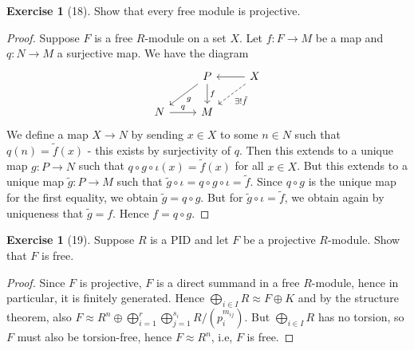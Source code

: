 \documentclass[reqno]{amsart}
\theoremstyle{definition}
\newtheorem{exercise}[theorem]{Exercise}
\theoremstyle{remark}
\begin{document}
    \begin{exercise}[18]
        Show that every free module is projective.
    \end{exercise}

    \begin{proof}
        Suppose $F$ is a free $R$-module on a set $X$.
        Let $f \colon F \to M$ be a map
        and $q \colon N \to M$ a surjective map. We have
        the diagram
        \begin{equation*}
        \begin{tikzcd}
            & P \ar[d, "f"] \ar[dl, "g"] & X \ar[l] \ar[ld, dashed, " 
            \exists ! \tilde{f}"] \\
            N \ar[r, "q"]  & M & 
        \end{tikzcd}
        \end{equation*}
        We define a map
        $X \to N$ by sending $x \in X$ to
        some $n \in N$ such that
        $q(n) = \tilde{f}(x)$ - this exists by
        surjectivity of $q$. Then this
        extends to a unique map $g \colon P \to N$ such that
        $q \circ g \circ \iota (x) = \tilde{f}(x)$ for all $x \in X$.
        But this extends to a unique map
        $\tilde{g} \colon P \to M$ such that
        $\tilde{g} \circ \iota = q \circ g \circ \iota
        = \tilde{f}$. Since
        $q \circ g$ is the unique map for
        the first equality, we obtain
        $\tilde{g} = q \circ g$. But for
        $\tilde{g} \circ \iota = \tilde{f}$, we obtain again
        by uniqueness that $\tilde{g} = f$. Hence
        $f = q \circ g$.
        
    \end{proof}

    \begin{exercise}[19]
        Suppose $R$ is a PID and let $F$ be a projective
        $R$-module. Show that $F$ is free.
    \end{exercise}

    \begin{proof}
        Since $F$ is projective, $F$ is a direct
        summand in a free $R$-module, hence in particular,
        it is finitely generated. Hence
        $\bigoplus_{i \in I} R \approx F \oplus K$ and
        by the structure theorem, also
        $F \approx R^{n} \oplus \bigoplus_{i=1}^{r} 
        \bigoplus_{j=1}^{s_i} R /\left( p_i^{m_{ij}} \right) $.
        But $\bigoplus_{i\in I} R$ has no torsion, so
        $F$ must also be torsion-free, hence
        $F \approx R^{n}$, i.e, $F$ is free.
    \end{proof}
\end{document}
